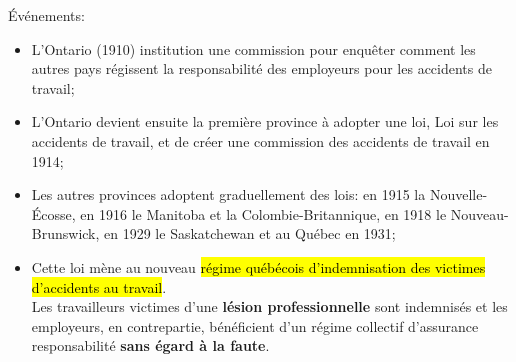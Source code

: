 \documentclass[10pt, french]{article}
\begin{document}
\begin{multicols*}{3}
Événements:
\begin{itemize}[leftmargin = *]
	\item	L'Ontario (1910) institution une commission pour enquêter comment les autres pays régissent la responsabilité des employeurs pour les accidents de travail;
	\item	L'Ontario devient ensuite la première province à adopter une loi, Loi sur les accidents de travail, et de créer une commission des accidents de travail en 1914;
	\item	Les autres provinces adoptent graduellement des lois: en 1915 la Nouvelle-Écosse, en 1916 le Manitoba et la Colombie-Britannique, en 1918 le Nouveau-Brunswick, en 1929 le Saskatchewan et au Québec en 1931;
	\item	Cette loi mène au nouveau \hl{régime québécois d'indemnisation des victimes d'accidents au travail}.	\\
			Les travailleurs victimes d'une \textbf{lésion professionnelle} sont indemnisés et les employeurs, en contrepartie, bénéficient d'un régime collectif d'assurance responsabilité \textbf{sans égard à la faute}.
\end{itemize}


\end{multicols*}
\end{document}
